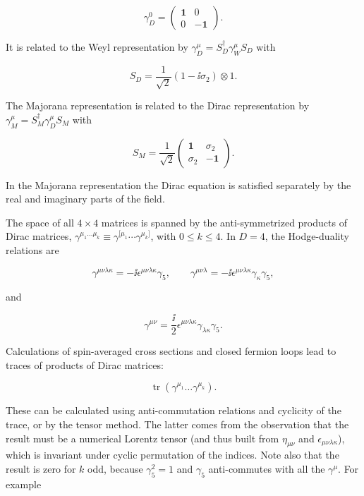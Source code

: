 \[
\gamma_D^0=\begin{pmatrix}\mathbf 1&0\\0&-\mathbf 1\end{pmatrix}.
\]

It is related to the Weyl representation by $\gamma_D^\mu=S_D^\dagger\gamma_W^\mu S_D$ with

\[
S_D=\frac{1}{\sqrt2}(1-\ii\sigma_2)\otimes1.
\]

The Majorana representation is related to the Dirac representation by $\gamma_M^\mu=S_M^\dagger\gamma_D^\mu S_M$
with

\[
S_M=\frac{1}{\sqrt2}
\begin{pmatrix}
\mathbf 1&\sigma_2\\
\sigma_2&-\mathbf 1
\end{pmatrix}.
\]

In the Majorana representation the Dirac equation is satisfied separately by the real
and imaginary parts of the field.

The space of all $4\times4$ matrices is spanned by the anti-symmetrized products of Dirac
matrices, $\gamma^{\mu_1\ldots\mu_k}\equiv
\gamma^{[\mu_1}\cdots\gamma^{\mu_k]}$, with $0\leq k\leq4$. In $D=4$, the
Hodge-duality relations are

\[
\gamma^{\mu\nu\lambda\kappa}=-\ii\epsilon^{\mu\nu\lambda\kappa}\gamma_5,
\qquad
\gamma^{\mu\nu\lambda}=-\ii\epsilon^{\mu\nu\lambda\kappa}\gamma_\kappa\gamma_5,
\]

and

\[
\gamma^{\mu\nu}=\frac{\ii}{2}\epsilon^{\mu\nu\lambda\kappa}
\gamma_{\lambda\kappa}\gamma_5.
\]

Calculations of spin-averaged cross sections and closed fermion loops lead to traces
of products of Dirac matrices:

\[
\operatorname{tr}(\gamma^{\mu_1}\ldots\gamma^{\mu_k}).
\]

These can be calculated using anti-commutation relations and cyclicity of the trace, or
by the tensor method. The latter comes from the observation that the result must be a
numerical Lorentz tensor (and thus built from $\eta_{\mu\nu}$ and $\epsilon_{\mu\nu\lambda\kappa}$), which is invariant under
cyclic permutation of the indices. Note also that the result is zero for $k$ odd, because
$\gamma_5^2=1$ and $\gamma_5$ anti-commutes with all the $\gamma^\mu$. For example

